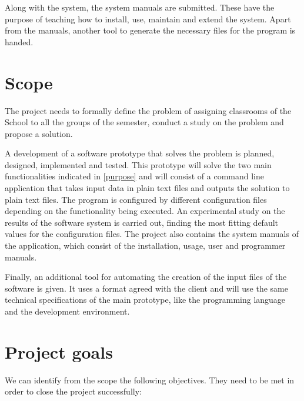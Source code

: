Along with the system, the system manuals are submitted. These have the purpose of teaching how to install, use, maintain and extend the system. Apart from the manuals, another tool to generate the necessary files for the program is handed.


\section{Scope}

The project needs to formally define the problem of assigning classrooms of the School to all the groups of the semester, conduct a study on the problem and propose a solution. 

A development of a software prototype that solves the problem is planned, designed, implemented and tested. This prototype will solve the two main functionalities indicated in \ref{purpose} and will consist of a command line application that takes input data in plain text files and outputs the solution to plain text files. The program is configured by different configuration files depending on the functionality being executed. An experimental study on the results of the software system is carried out, finding the most fitting default values for the configuration files. The project also contains the system manuals of the application, which consist of the installation, usage, user and programmer manuals. 

Finally, an additional tool for automating the creation of the input files of the software is given. It uses a format agreed with the client and will use the same technical specifications of the main prototype, like the programming language and the development environment.


\section{Project goals}

We can identify from the scope the following objectives. They need to be met in order to close the project successfully:

